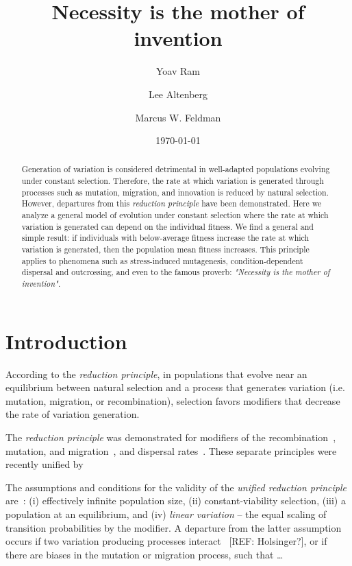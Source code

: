 \documentclass[9pt, a4paper, twocolumn]{extarticle}   	%
\title{Necessity is the mother of invention}
\author[a]{Yoav Ram}
\author[b]{Lee Altenberg}
\author[a]{Marcus W. Feldman}
\affil[a]{Department of Biology, Stanford University, Stanford, CA}
\affil[b]{Information and Computer Sciences, University of Hawai`I at M{\=a}noa, Honolulu, HI}
\date{\today} %
\begin{document}
\maketitle

\begin{abstract}
Generation of variation is considered detrimental in well-adapted
populations evolving under constant selection.
Therefore, the rate at which variation is generated through processes such as mutation,
migration, and innovation is reduced by natural selection.
However, departures from this \emph{reduction principle} have been demonstrated.
Here we analyze a general model of evolution under constant selection where the rate at which variation is generated can depend on the individual fitness.
We find a general and simple result:
if individuals with below-average fitness increase the rate at which variation is generated,
then the population mean fitness increases.
This principle applies to phenomena such as stress-induced mutagenesis,
condition-dependent dispersal and outcrossing,
and even to the famous proverb: \emph{"Necessity is the mother of invention"}.
\end{abstract}

\section*{Introduction}

According to the \emph{reduction principle}, in populations that evolve near an equilibrium between natural selection and a process that generates variation (i.e. mutation, migration, or recombination), selection favors modifiers that decrease the rate of variation generation. 

The \emph{reduction principle} was demonstrated for modifiers of the recombination~\citep{Feldman1972}, mutation, and migration~\citep{Liberman1986a}, and dispersal rates~\citep{Altenberg1987}.
These separate principles were recently unified by~\citet{Altenberg2017}

The assumptions and conditions for the validity of the \emph{unified reduction principle} are~\citep{Altenberg2017}:
(i) effectively infinite population size, (ii) constant-viability selection, (iii) a population at an equilibrium, and (iv) \emph{linear variation} -- the equal scaling of transition probabilities by the modifier.
A departure from the latter assumption occurs if two variation producing processes interact~\citep{Altenberg2012} [REF: Holsinger?], or if there are biases in the mutation or migration process, such that \ldots{}
\end{document}
